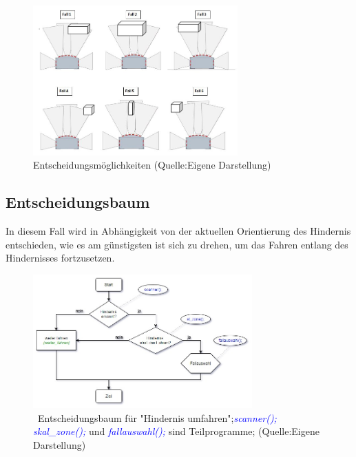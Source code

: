 \begin{figure}[!h]  %
	\centering\includegraphics[width=0.7\textwidth]{images/faelle.jpg}
	\caption{ Entscheidungsmöglichkeiten (Quelle:Eigene Darstellung)}
	\label{faelle} %
\end{figure}

\subsection{Entscheidungsbaum}

 In diesem Fall wird in Abhängigkeit von der aktuellen Orientierung des Hindernis entschieden, wie es am günstigsten ist sich zu drehen, um das Fahren entlang des Hindernisses fortzusetzen. 
 
\begin{figure}[!h] 
	\centering\includegraphics[width=0.75\textwidth]{images/Entsch-baum1.jpg}
	\caption{ \ Entscheidungsbaum für "Hindernis umfahren";\textcolor{blue}{\textit{scanner(); skal\_zone();}} und \textcolor{blue}{\textit {fallauswahl();}} sind Teilprogramme;   (Quelle:Eigene Darstellung)}
	\label{baum1} 
\end{figure}

